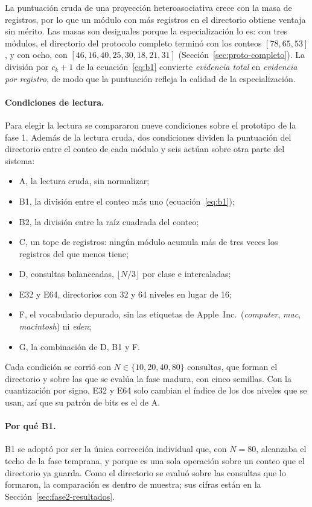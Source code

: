 La puntuación cruda de una proyección heteroasociativa crece con la masa de registros,
por lo que un módulo con más registros en el directorio obtiene ventaja sin mérito.
Las masas son desiguales porque la especialización lo es: con tres módulos, el
directorio del protocolo completo terminó con los conteos $[78, 65, 53]$, y con ocho,
con $[46, 16, 40, 25, 30, 18, 21, 31]$ (Sección~\ref{sec:proto-completo}).
La división por $c_k + 1$ de la ecuación~\eqref{eq:b1} convierte \emph{evidencia total}
en \emph{evidencia por registro}, de modo que la puntuación refleja la calidad de la
especialización.

\paragraph{Condiciones de lectura.}
Para elegir la lectura se compararon nueve condiciones sobre el prototipo de la fase 1.
Además de la lectura cruda, dos condiciones dividen la puntuación del directorio entre el
conteo de cada módulo y seis actúan sobre otra parte del sistema:
\begin{itemize}
    \item A, la lectura cruda, sin normalizar;
    \item B1, la división entre el conteo más uno (ecuación~\eqref{eq:b1});
    \item B2, la división entre la raíz cuadrada del conteo;
    \item C, un tope de registros: ningún módulo acumula más de tres veces los registros
    del que menos tiene;
    \item D, consultas balanceadas, $\lfloor N/3 \rfloor$ por clase e intercaladas;
    \item E32 y E64, directorios con 32 y 64 niveles en lugar de 16;
    \item F, el vocabulario depurado, sin las etiquetas de Apple~Inc.\
    (\textit{computer}, \textit{mac}, \textit{macintosh}) ni \textit{eden};
    \item G, la combinación de D, B1 y F.
\end{itemize}
Cada condición se corrió con $N \in \{10, 20, 40, 80\}$ consultas, que forman el
directorio y sobre las que se evalúa la fase madura, con cinco semillas.
Con la cuantización por signo, E32 y E64 solo cambian el índice de los dos niveles que
se usan, así que su patrón de bits es el de A.

\paragraph{Por qué B1.}
B1 se adoptó por ser la única corrección individual que, con $N = 80$, alcanzaba el
techo de la fase temprana, y porque es una sola operación sobre un conteo que el
directorio ya guarda.
Como el directorio se evaluó sobre las consultas que lo formaron, la comparación es
dentro de muestra; sus cifras están en la Sección~\ref{sec:fase2-resultados}.

